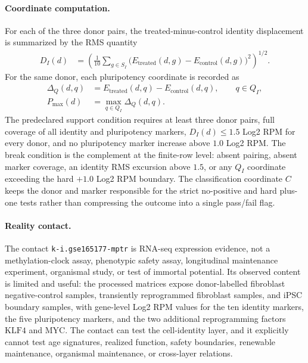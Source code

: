\paragraph{Coordinate computation.}
For each of the three donor pairs, the treated-minus-control identity displacement is summarized by the RMS quantity
$$
\begin{aligned}
D_I(d) &= \left(\frac{1}{10}\sum_{g\in S_I}\big(E_{\mathrm{treated}}(d,g)-E_{\mathrm{control}}(d,g)\big)^2\right)^{1/2}.
\end{aligned}
$$
For the same donor, each pluripotency coordinate is recorded as
$$
\begin{aligned}
\Delta_Q(d,q) &= E_{\mathrm{treated}}(d,q)-E_{\mathrm{control}}(d,q),\qquad q\in Q_I,\\
P_{\max}(d) &= \max_{q\in Q_I}\Delta_Q(d,q).
\end{aligned}
$$
The predeclared support condition requires at least three donor pairs, full coverage of all identity and pluripotency markers, $D_I(d)\leq 1.5$ Log2 RPM for every donor, and no pluripotency marker increase above $1.0$ Log2 RPM.  The break condition is the complement at the finite-row level: absent pairing, absent marker coverage, an identity RMS excursion above $1.5$, or any $Q_I$ coordinate exceeding the hard $+1.0$ Log2 RPM boundary.  The classification coordinate $C$ keeps the donor and marker responsible for the strict no-positive and hard plus-one tests rather than compressing the outcome into a single pass/fail flag.

\paragraph{Reality contact.}
The contact \texttt{k-i.gse165177-mptr} is RNA-seq expression evidence, not a methylation-clock assay, phenotypic safety assay, longitudinal maintenance experiment, organismal study, or test of immortal potential.  Its observed content is limited and useful: the processed matrices expose donor-labelled fibroblast negative-control samples, transiently reprogrammed fibroblast samples, and iPSC boundary samples, with gene-level Log2 RPM values for the ten identity markers, the five pluripotency markers, and the two additional reprogramming factors $\mathrm{KLF4}$ and $\mathrm{MYC}$.  The contact can test the cell-identity layer, and it explicitly cannot test age signatures, realized function, safety boundaries, renewable maintenance, organismal maintenance, or cross-layer relations.

